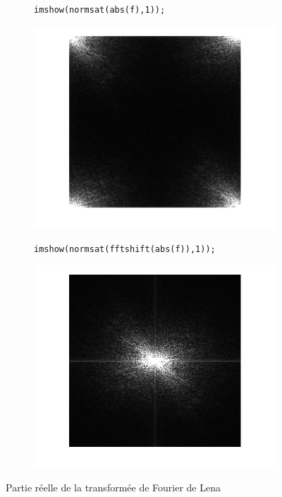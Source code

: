 \documentclass[12pt,a4paper,onecolumn]{article}
\begin{document}
\begin{figure}[H]
	\centering
	\begin{subfigure}[b]{\textwidth}
		\centering
		\begin{lstlisting}[frame = none, numbers = none]
		imshow(normsat(abs(f),1));
		\end{lstlisting}
		\includegraphics[scale = 1, height = 0.3\textheight]{7_31}
	\end{subfigure}
	\vspace{2cm}
	\begin{subfigure}[b]{\textwidth}
		\centering
		\begin{lstlisting}[frame=none, numbers = none]
		imshow(normsat(fftshift(abs(f)),1));
		\end{lstlisting}
		\includegraphics[scale = 1, height = 0.3\textheight]{7_32}
	\end{subfigure}
	\caption{Partie réelle de la transformée de Fourier de Lena}
	\label{7_3}
\end{figure}
\end{document}
